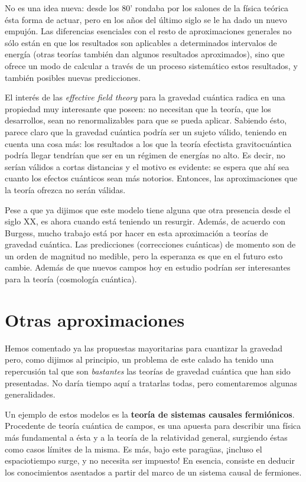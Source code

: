 \documentclass[11pt,a4paper,titlepage]{article}
\begin{document}
No es una idea nueva: desde los 80' rondaba por los salones de la física teórica ésta forma de actuar, pero en los años del último siglo se le ha dado un nuevo empujón. Las diferencias esenciales con el resto de aproximaciones generales no sólo están en que los resultados son aplicables a determinados intervalos de energía (otras teorías también dan algunos resultados aproximados), sino que ofrece un modo de calcular a través de un proceso sistemático estos resultados, y también posibles nuevas predicciones.

El interés de las \textit{effective field theory} para la gravedad cuántica radica en una propiedad muy interesante que poseen: no necesitan que la teoría, que los desarrollos, sean no renormalizables para que se pueda aplicar. Sabiendo ésto, parece claro que la gravedad cuántica podría ser un sujeto válido, teniendo en cuenta una cosa más: los resultados a los que la teoría efectista gravitocuántica podría llegar tendrían que ser en un régimen de energías no alto. Es decir, no serían válidos a cortas distancias y el motivo es evidente: se espera que ahí sea cuanto los efectos cuánticos sean más notorios. Entonces, las aproximaciones que la teoría ofrezca no serán válidas.

Pese a que ya dijimos que este modelo tiene alguna que otra presencia desde el siglo XX, es ahora cuando está teniendo un resurgir. Además, de acuerdo con Burgess, mucho trabajo está por hacer en esta aproximación a teorías de gravedad cuántica. Las predicciones (correcciones cuánticas) de momento son de un orden de magnitud no medible, pero la esperanza es que en el futuro esto cambie. Además de que nuevos campos hoy en estudio podrían ser interesantes para la teoría (cosmología cuántica).

%
%
%
%
\newpage
\section{Otras aproximaciones} %

Hemos comentado ya las propuestas mayoritarias para cuantizar la gravedad pero, como dijimos al principio, un problema de este calado ha tenido una repercusión tal que son \textit{bastantes} las teorías de gravedad cuántica que han sido presentadas. No daría tiempo aquí a tratarlas todas, pero comentaremos algunas generalidades.

Un ejemplo de estos modelos es la \textbf{teoría de sistemas causales fermiónicos}. Procedente de teoría cuántica de campos, es una apuesta para describir una física más fundamental a ésta y a la teoría de la relatividad general, surgiendo éstas como casos límites de la misma. Es más, bajo este paragüas, ¡incluso el espaciotiempo surge, y no necesita ser impuesto! En esencia, consiste en deducir los conocimientos asentados a partir del marco de un sistema causal de fermiones.
\end{document}
